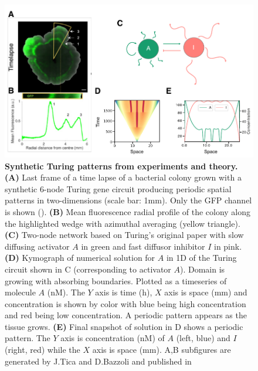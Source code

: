 \documentclass[10pt,letterpaper]{article}
\begin{document}
\begin{figure}[bp!]
    \includegraphics[width=1\textwidth]{figures/biological_example}

    \caption{{\bf Synthetic Turing patterns from experiments and theory.}
        \textbf{(A)} Last frame of a time lapse of a bacterial colony grown with a synthetic 6-node Turing gene circuit producing periodic spatial patterns in two-dimensions (scale bar: 1mm). Only the GFP channel is shown (\cite{Oliver2023}). \textbf{(B)} Mean fluorescence radial profile of the colony along the highlighted wedge with azimuthal averaging (yellow triangle). \textbf{(C)} Two-node network based on Turing’s original paper \cite{Turing1952} with slow diffusing activator $A$ in green and fast diffusor inhibitor $I$ in pink. \textbf{(D)} Kymograph of numerical solution for $A$ in 1D of the Turing circuit shown in C (corresponding to activator $A$). Domain is growing with absorbing boundaries. Plotted as a timeseries of molecule $A$ (nM). The $Y$ axis is time (h), $X$ axis is space (mm) and concentration is shown by color with blue being high concentration and red being low concentration. A periodic pattern appears as the tissue grows. \textbf{(E)} Final snapshot of solution in D shows a periodic pattern. The $Y$ axis is concentration (nM) of $A$ (left, blue) and $I$ (right, red) while the $X$ axis is space (mm). A,B subfigures are generated by J.Tica and D.Bazzoli and published in \cite{Oliver2023}}
    \label{fig1}
\end{figure}
\end{document}

